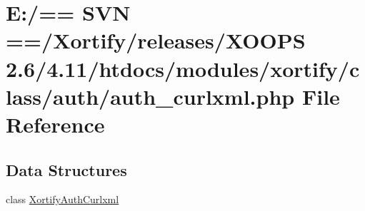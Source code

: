 \hypertarget{auth__curlxml_8php}{\section{E\-:/== S\-V\-N ==/\-Xortify/releases/\-X\-O\-O\-P\-S 2.6/4.11/htdocs/modules/xortify/class/auth/auth\-\_\-curlxml.php File Reference}
\label{auth__curlxml_8php}
}
\subsection*{Data Structures}
\begin{DoxyCompactItemize}
\item 
class \hyperlink{class_xortify_auth_curlxml}{Xortify\-Auth\-Curlxml}
\end{DoxyCompactItemize}

